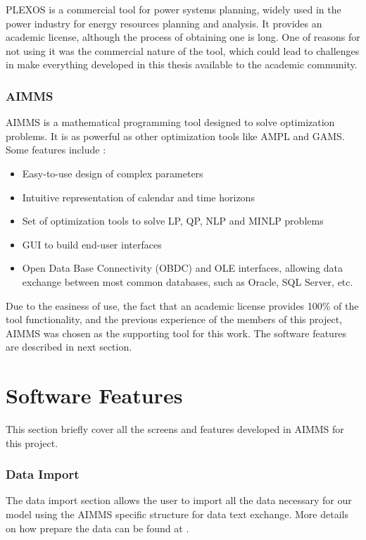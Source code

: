 \documentclass[12pt,LUDisStyle,twosided]{book}
\begin{document}
PLEXOS \textregistered is a commercial tool for power systems planning, widely used in the power industry for energy resources planning and analysis. It provides an academic license, although the process of obtaining one is long. One of reasons for not using it was the commercial nature of the tool, which could lead to challenges in make everything developed in this thesis available to the academic community.  

\subsubsection{AIMMS}


AIMMS is a mathematical programming tool designed to solve optimization problems. It is as powerful as other optimization tools like AMPL and GAMS. Some features include \cite{bisschop}:

\begin{itemize}
\item Easy-to-use design of complex parameters
\item Intuitive representation of calendar and time horizons
\item Set of optimization tools to solve LP, QP, NLP and MINLP problems
\item GUI to build end-user interfaces
\item Open Data Base Connectivity (OBDC) and OLE interfaces, allowing data exchange between most common databases, such as Oracle, SQL Server, etc.
\end{itemize}

Due to the easiness of use, the fact that an academic license provides 100\% of the tool functionality, and the previous experience of the members of this project, AIMMS was chosen as the supporting tool for this work. The software features are described in next section.

\section{Software Features}

This section briefly cover all the screens and features developed in AIMMS for this project.

\subsubsection{Data Import}

The data import section allows the user to import all the data necessary for our model using the AIMMS specific structure for data text exchange. More details on how prepare the data can be found at \cite{bisschop}.
\end{document}
